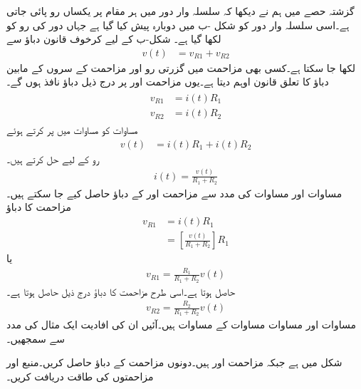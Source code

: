گزشتہ حصے میں ہم نے دیکھا کہ سلسلہ وار دور میں ہر مقام پر یکساں رو پائی جاتی ہے۔اسی سلسلہ وار دور کو شکل -ب میں دوبارہ پیش کیا گیا ہے جہاں دور کی رو کو  لکھا گیا ہے۔ شکل-ب کے لیے کرخوف قانون دباؤ سے
\begin{align}\label{مساوات_مزاحمتی_تقسیم_دباو_الف}
v(t)&=v_{R1}+v_{R2}
\end{align}
لکھا جا سکتا ہے۔کسی بھی مزاحمت میں گزرتی رو اور مزاحمت کے سروں کے مابین دباؤ کا تعلق قانون اوہم دیتا ہے۔یوں مزاحمت  اور  پر درج ذیل دباؤ نافذ ہوں گے۔
\begin{gather}
\begin{aligned}\label{مساوات_مزاحمتی_تقسیم_دباو_ب}
v_{R1}&=i(t) R_1 \\
v_{R2}&=i(t) R_2
\end{aligned}
\end{gather}
مساوات  کو مساوات  میں پر کرتے ہوئے
\begin{align}
v(t)&=i(t) R_1+i(t) R_2
\end{align}
رو کے لیے حل کرتے ہیں۔
\begin{align}\label{مساوات_مزاحمتی_تقسیم_دباو_ت}
i(t)=\frac{v(t)}{R_1+R_2}
\end{align}
مساوات  اور مساوات  کی مدد سے مزاحمت  اور  کے دباؤ حاصل کیے جا سکتے ہیں۔مزاحمت  کا دباؤ
\begin{align*}
v_{R1}&=i(t) R_1\\
&=\left[\frac{v(t)}{R_1+R_2}\right] R_1
\end{align*}
یا
\begin{align}\label{مساوات_مزاحمتی_تقسیم_دباو_ٹ}
v_{R1}=\frac{R_1}{R_1+R_2} v(t)
\end{align}
حاصل ہوتا ہے۔اسی طرح مزاحمت  کا دباؤ درج ذیل حاصل ہوتا ہے۔
\begin{align}\label{مساوات_مزاحمتی_تقسیم_دباو_ث}
v_{R2}=\frac{R_2}{R_1+R_2} v(t)
\end{align}
مساوات  اور مساوات مساوات   کے مساوات ہیں۔آئیں ان کی افادیت ایک مثال کی مدد سے سمجھیں۔

شکل  میں  ہے جبکہ مزاحمت  اور  ہیں۔دونوں مزاحمت کے دباؤ حاصل کریں۔منبع اور مزاحمتوں کی طاقت دریافت کریں۔


